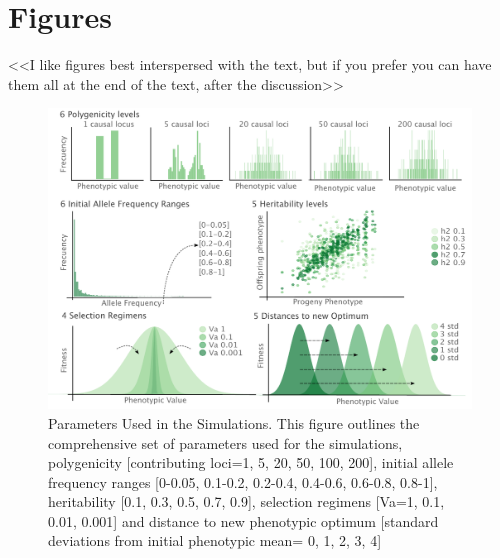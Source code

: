 \documentclass{article}
\begin{document}
\section{Figures}

<<I like figures best interspersed with the text, but if you prefer you can have them all at the end of the text, after the discussion>>
\begin{figure}[b]
    \centering
    \includegraphics[width=1\textwidth]{figures/parameters.pdf}
    \caption{Parameters Used in the Simulations. This figure outlines the comprehensive set of parameters used for the simulations, polygenicity [contributing loci=1, 5, 20, 50, 100, 200], initial allele frequency ranges [0-0.05, 0.1-0.2, 0.2-0.4, 0.4-0.6, 0.6-0.8, 0.8-1], heritability [0.1, 0.3, 0.5, 0.7, 0.9], selection regimens  [Va=1, 0.1, 0.01, 0.001] and distance to new phenotypic optimum [standard deviations from initial phenotypic mean= 0, 1, 2, 3, 4]}
    \label{fig:parameters}
\end{figure}
\end{document}
